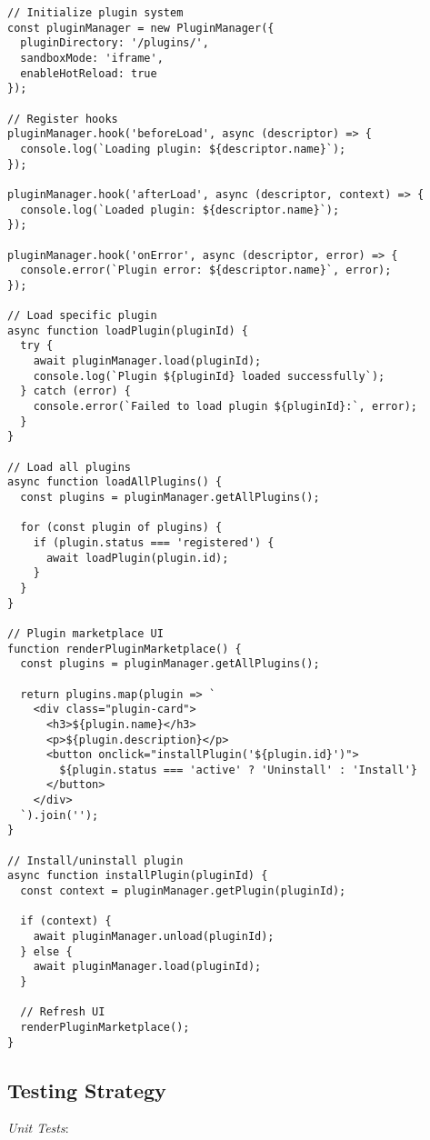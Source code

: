 \documentclass[11pt]{article}
\begin{document}
\begin{verbatim}
// Initialize plugin system
const pluginManager = new PluginManager({
  pluginDirectory: '/plugins/',
  sandboxMode: 'iframe',
  enableHotReload: true
});

// Register hooks
pluginManager.hook('beforeLoad', async (descriptor) => {
  console.log(`Loading plugin: ${descriptor.name}`);
});

pluginManager.hook('afterLoad', async (descriptor, context) => {
  console.log(`Loaded plugin: ${descriptor.name}`);
});

pluginManager.hook('onError', async (descriptor, error) => {
  console.error(`Plugin error: ${descriptor.name}`, error);
});

// Load specific plugin
async function loadPlugin(pluginId) {
  try {
    await pluginManager.load(pluginId);
    console.log(`Plugin ${pluginId} loaded successfully`);
  } catch (error) {
    console.error(`Failed to load plugin ${pluginId}:`, error);
  }
}

// Load all plugins
async function loadAllPlugins() {
  const plugins = pluginManager.getAllPlugins();
  
  for (const plugin of plugins) {
    if (plugin.status === 'registered') {
      await loadPlugin(plugin.id);
    }
  }
}

// Plugin marketplace UI
function renderPluginMarketplace() {
  const plugins = pluginManager.getAllPlugins();
  
  return plugins.map(plugin => `
    <div class="plugin-card">
      <h3>${plugin.name}</h3>
      <p>${plugin.description}</p>
      <button onclick="installPlugin('${plugin.id}')">
        ${plugin.status === 'active' ? 'Uninstall' : 'Install'}
      </button>
    </div>
  `).join('');
}

// Install/uninstall plugin
async function installPlugin(pluginId) {
  const context = pluginManager.getPlugin(pluginId);
  
  if (context) {
    await pluginManager.unload(pluginId);
  } else {
    await pluginManager.load(pluginId);
  }
  
  // Refresh UI
  renderPluginMarketplace();
}
\end{verbatim}
\subsection{Testing Strategy}
\label{sec:org3e9b191}

\emph{Unit Tests}:
\end{document}

